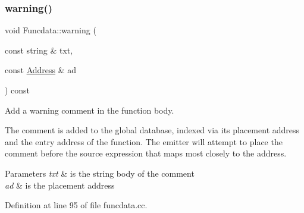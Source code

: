 \subsubsection{\texorpdfstring{warning()}{warning()}}
{\footnotesize\ttfamily void Funcdata\+::warning (\begin{DoxyParamCaption}\item[{const string \&}]{txt,  }\item[{const \mbox{\hyperlink{class_address}{Address}} \&}]{ad }\end{DoxyParamCaption}) const}



Add a warning comment in the function body. 

The comment is added to the global database, indexed via its placement address and the entry address of the function. The emitter will attempt to place the comment before the source expression that maps most closely to the address. 
\begin{DoxyParams}{Parameters}
{\em txt} & is the string body of the comment \\
\hline
{\em ad} & is the placement address \\
\hline
\end{DoxyParams}


Definition at line 95 of file funcdata.\+cc.

